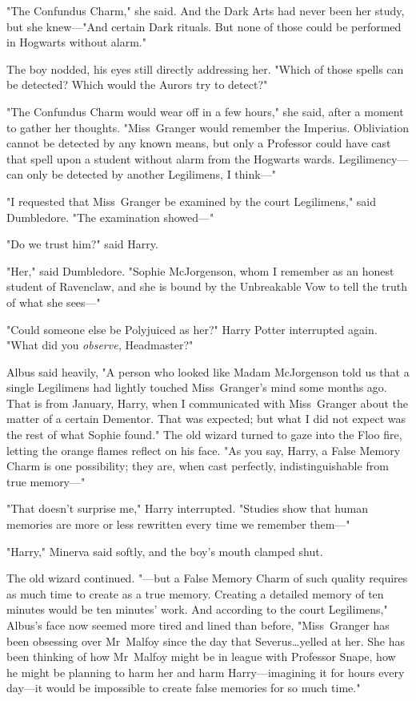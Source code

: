 "The Confundus Charm," she said. And the Dark Arts had never been her study,
but she knew—"And certain Dark rituals. But none of those could be performed
in Hogwarts without alarm."

The boy nodded, his eyes still directly addressing her. "Which of those spells
can be detected? Which would the Aurors try to detect?"

"The Confundus Charm would wear off in a few hours," she said, after a moment
to gather her thoughts. "Miss~Granger would remember the Imperius. Obliviation
cannot be detected by any known means, but only a Professor could have cast
that spell upon a student without alarm from the Hogwarts wards.
Legilimency—can only be detected by another Legilimens, I think—"

"I requested that Miss~Granger be examined by the court Legilimens," said
Dumbledore. "The examination showed—"

"Do we trust him?" said Harry.

"Her," said Dumbledore. "Sophie McJorgenson, whom I remember as an honest
student of Ravenclaw, and she is bound by the Unbreakable Vow to tell the truth
of what she sees—"

"Could someone else be Polyjuiced as her?" Harry Potter interrupted again.
"What did you \emph{observe,} Headmaster?"

Albus said heavily, "A person who looked like Madam McJorgenson told us that a
single Legilimens had lightly touched Miss~Granger's mind some months ago. That
is from January, Harry, when I communicated with Miss~Granger about the matter
of a certain Dementor. That was expected; but what I did not expect was the
rest of what Sophie found." The old wizard turned to gaze into the Floo fire,
letting the orange flames reflect on his face. "As you say, Harry, a False
Memory Charm is one possibility; they are, when cast perfectly,
indistinguishable from true memory—"

"That doesn't surprise me," Harry interrupted. "Studies show that human
memories are more or less rewritten every time we remember them—"

"Harry," Minerva said softly, and the boy's mouth clamped shut.

The old wizard continued. "—but a False Memory Charm of such quality requires
as much time to create as a true memory. Creating a detailed memory of ten
minutes would be ten minutes' work. And according to the court Legilimens,"
Albus's face now seemed more tired and lined than before, "Miss~Granger has
been obsessing over Mr~Malfoy since the day that Severus…yelled at
her. She has been thinking of how Mr~Malfoy might be in league with Professor
Snape, how he might be planning to harm her and harm Harry—imagining it for
hours every day—it would be impossible to create false memories for so much
time."

